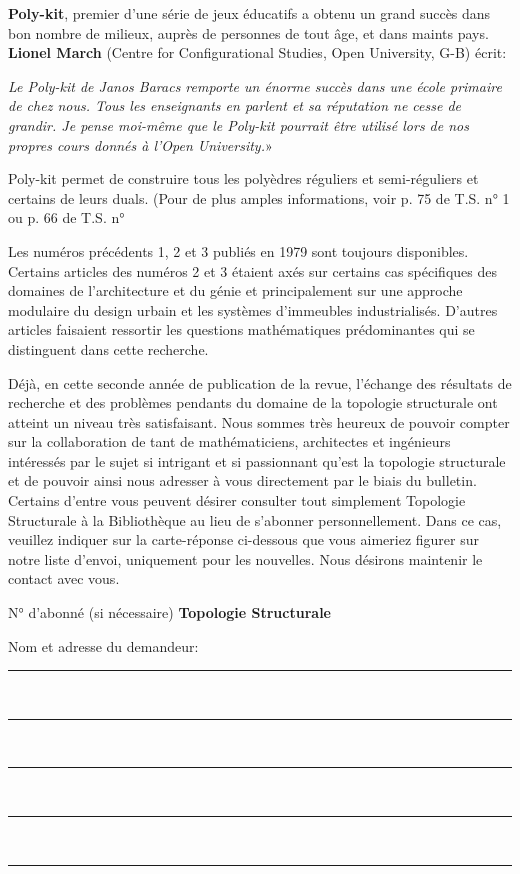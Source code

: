 \textbf{Poly-kit}, premier d'une série de jeux éducatifs a obtenu un grand succès dans bon nombre de milieux, auprès de personnes de tout âge, et dans maints pays. \textbf{Lionel March} (Centre for Configurational Studies, Open University, G-B) écrit:

\textit{Le Poly-kit de Janos Baracs remporte un énorme succès dans une école primaire de chez nous. Tous les enseignants en parlent et sa réputation ne cesse de grandir. Je pense moi-même que le Poly-kit pourrait être utilisé lors de nos propres cours donnés à l'Open University.}»

Poly-kit permet de construire tous les polyèdres réguliers et semi-réguliers et certains de leurs duals. (Pour de plus amples informations, voir p. 75 de T.S. n° 1 ou p. 66 de T.S. n° 

Les numéros précédents 1, 2 et 3 publiés en 1979 sont toujours disponibles. Certains articles des numéros 2 et 3 étaient axés sur certains cas spécifiques des domaines de l'architecture et du génie et principalement sur une approche modulaire du design urbain et les systèmes d'immeubles industrialisés. D'autres articles faisaient ressortir les questions mathématiques prédominantes qui se distinguent dans cette recherche.

Déjà, en cette seconde année de publication de la revue, l'échange des résultats de recherche et des problèmes pendants du domaine de la topologie structurale ont atteint un niveau très satisfaisant. Nous sommes très heureux de pouvoir compter sur la collaboration de tant de mathématiciens, architectes et ingénieurs intéressés par le sujet si intrigant et si passionnant qu'est la topologie structurale et de pouvoir ainsi nous adresser à vous directement par le biais du bulletin. Certains d'entre vous peuvent désirer consulter tout simplement Topologie Structurale à la Bibliothèque au lieu de s'abonner personnellement. Dans ce cas, veuillez indiquer sur la carte-réponse ci-dessous que vous aimeriez figurer sur notre liste d'envoi, uniquement pour les nouvelles. Nous désirons maintenir le contact avec vous.

\noindent\dotfill

\noindent N° d'abonné (si nécessaire) \underline{\hspace{1cm}}\hfill\textbf{\Large Topologie Structurale}

Nom et adresse du demandeur:
\begin{center}
\rule{.8\linewidth}{.4pt}\\[1ex]
\rule{.8\linewidth}{.4pt}\\[1ex]
\rule{.8\linewidth}{.4pt}\\[1ex]
\rule{.8\linewidth}{.4pt}\\[1ex]
\rule{.8\linewidth}{.4pt}
\end{center}

